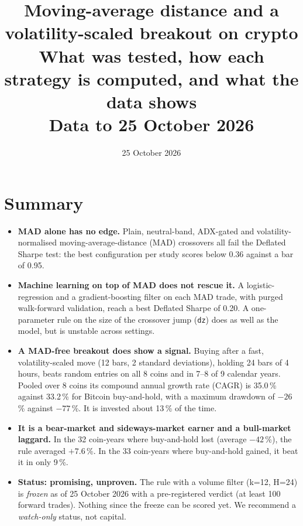 \documentclass[11pt,a4paper]{article}
\title{Moving-average distance and a volatility-scaled breakout on crypto\\[4pt]\large What was tested, how each strategy is computed, and what the data shows\\[2pt]\normalsize Data to 25 October 2026}
\date{25 October 2026}
\newcommand{\code}[1]{\texttt{#1}}
\begin{document}
\maketitle

\noindent{}

\section*{Summary}
\begin{itemize}
\item \textbf{MAD alone has no edge.} Plain, neutral-band, ADX-gated and volatility-normalised moving-average-distance (MAD) crossovers all fail
the Deflated Sharpe test: the best configuration per study scores below 0.36 against a bar of 0.95.
\item \textbf{Machine learning on top of MAD does not rescue it.} A logistic-regression and a gradient-boosting filter on each MAD trade, with
purged walk-forward validation, reach a best Deflated Sharpe of 0.20. A one-parameter rule on the size of the crossover jump (\code{dz}) does as well
as the model, but is unstable across settings.
\item \textbf{A MAD-free breakout does show a signal.} Buying after a fast, volatility-scaled move (12 bars, 2 standard deviations),
holding 24 bars of 4 hours, beats random entries on all 8 coins and in 7--8 of 9 calendar years. Pooled over 8 coins its compound
annual growth rate (CAGR) is 35.0\,\% against 33.2\,\% for Bitcoin buy-and-hold, with a maximum drawdown of $-26$\,\% against $-77$\,\%.
It is invested about 13\,\% of the time.
\item \textbf{It is a bear-market and sideways-market earner and a bull-market laggard.} In the 32 coin-years where buy-and-hold lost
(average $-42$\,\%), the rule averaged $+7.6$\,\%. In the 33 coin-years where buy-and-hold gained, it beat it in only 9\,\%.
\item \textbf{Status: promising, unproven.} The rule with a volume filter (k=12, H=24) is \emph{frozen} as of 25 October 2026 with a
pre-registered verdict (at least 100 forward trades). Nothing since the freeze can be scored yet. We recommend a \emph{watch-only} status,
not capital.
\end{itemize}
\end{document}
